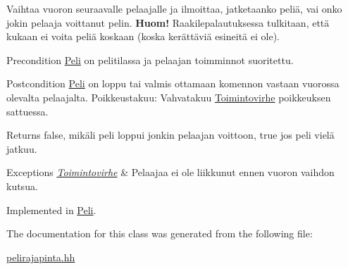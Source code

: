 Vaihtaa vuoron seuraavalle pelaajalle ja ilmoittaa, jatketaanko peliä, vai onko jokin pelaaja voittanut pelin. {\bfseries Huom!} Raakilepalautuksessa tulkitaan, että kukaan ei voita peliä koskaan (koska kerättäviä esineitä ei ole). 

\begin{DoxyPrecond}{Precondition}
\hyperlink{class_peli}{Peli} on pelitilassa ja pelaajan toimminnot suoritettu. 
\end{DoxyPrecond}
\begin{DoxyPostcond}{Postcondition}
\hyperlink{class_peli}{Peli} on loppu tai valmis ottamaan komennon vastaan vuorossa olevalta pelaajalta. Poikkeustakuu\+: Vahvatakuu \hyperlink{class_julkinen_1_1_toimintovirhe}{Toimintovirhe} poikkeuksen sattuessa.
\end{DoxyPostcond}
\begin{DoxyReturn}{Returns}
{\ttfamily false}, mikäli peli loppui jonkin pelaajan voittoon, {\ttfamily true} jos peli vielä jatkuu.
\end{DoxyReturn}

\begin{DoxyExceptions}{Exceptions}
{\em \hyperlink{class_julkinen_1_1_toimintovirhe}{Toimintovirhe}} & Pelaajaa ei ole liikkunut ennen vuoron vaihdon kutsua. \\
\hline
\end{DoxyExceptions}


Implemented in \hyperlink{class_peli_a6788584913d8417dd2fa0bf486e5a3b3}{Peli}.



The documentation for this class was generated from the following file\+:\begin{DoxyCompactItemize}
\item 
\hyperlink{pelirajapinta_8hh}{pelirajapinta.\+hh}\end{DoxyCompactItemize}
